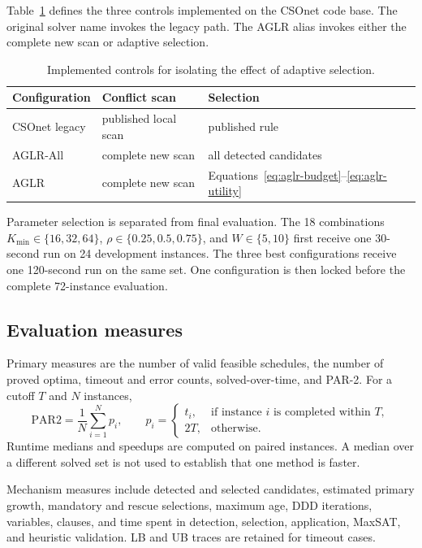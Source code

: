 \documentclass[preprint,12pt,authoryear]{elsarticle}
\begin{document}
Table~\ref{tab:ablation-configurations} defines the three controls implemented
on the CSOnet code base. The original solver name invokes the legacy path. The
AGLR alias invokes either the complete new scan or adaptive selection.

\begin{table}[htbp]
\centering
\caption{Implemented controls for isolating the effect of adaptive selection.}
\label{tab:ablation-configurations}
\begin{tabular}{lll}
\toprule
Configuration & Conflict scan & Selection \\
\midrule
CSOnet legacy & published local scan & published rule \\
AGLR-All & complete new scan & all detected candidates \\
AGLR & complete new scan & Equations~\eqref{eq:aglr-budget}--\eqref{eq:aglr-utility} \\
\bottomrule
\end{tabular}
\end{table}

Parameter selection is separated from final evaluation. The 18 combinations
$K_{\min}\in\{16,32,64\}$, $\rho\in\{0.25,0.5,0.75\}$, and
$W\in\{5,10\}$ first receive one 30-second run on 24 development instances.
The three best configurations receive one 120-second run on the same set. One
configuration is then locked before the complete 72-instance evaluation.

\subsection{Evaluation measures}

Primary measures are the number of valid feasible schedules, the number of
proved optima, timeout and error counts, solved-over-time, and PAR-2. For a
cutoff $T$ and $N$ instances,
\begin{equation}
\mathrm{PAR2}=\frac1N\sum_{i=1}^{N}p_i,\qquad
p_i=
\begin{cases}
t_i,&\text{if instance }i\text{ is completed within }T,\\
2T,&\text{otherwise}.
\end{cases}
\label{eq:par2}
\end{equation}
Runtime medians and speedups are computed on paired instances. A median over a
different solved set is not used to establish that one method is faster.

Mechanism measures include detected and selected candidates, estimated primary
growth, mandatory and rescue selections, maximum age, DDD iterations, variables,
clauses, and time spent in detection, selection, application, MaxSAT, and
heuristic validation. LB and UB traces are retained for timeout cases.
\end{document}
